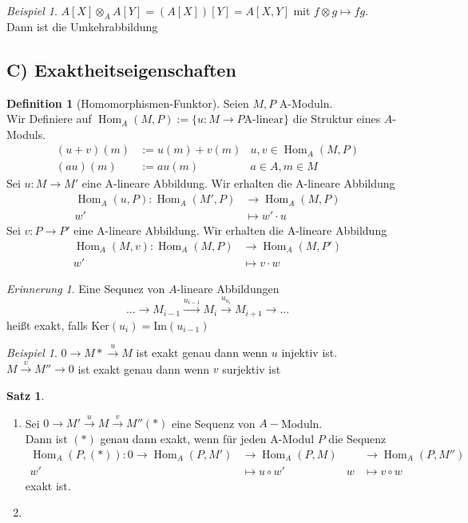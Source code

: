 \documentclass[10pt,a4paper]{article}
\newcommand{\Hom}{\operatorname{Hom}}
\newcounter{thm}[section]
\theoremstyle{definition}
\newtheorem{definition}[thm]{Definition}
\newtheorem{satz}[thm]{Satz}
\theoremstyle{plain}
\theoremstyle{remark}
\newtheorem{rem}[thm]{Erinnerung}
\newtheorem{exm}[thm]{Beispiel}
\begin{document}
\begin{exm}
	$A[X]\otimes_A A[Y]=(A[X])[Y]=A[X,Y]$ mit $f\otimes g\mapsto fg$.\\
	Dann ist die Umkehrabbildung
\end{exm}
\subsection*{C) Exaktheitseigenschaften}
\begin{definition}[Homomorphismen-Funktor]
	Seien $M,P$ A-Moduln.\\
	Wir Definiere auf $\Hom_A(M,P):=\{u:M\rightarrow P \text{A-linear}\}$ die Struktur eines $A$-Moduls.
	\begin{align*}
	(u+v)(m)&:=u(m)+v(m) &u,v\in\Hom_A(M,P)\\
	(au)(m)&:=au(m)		 &a\in A,m\in M
	\end{align*}
	Sei $u:M\rightarrow M'$ eine A-lineare Abbildung. Wir erhalten die A-lineare Abbildung
	\begin{align*}
	\Hom_A(u,P):\Hom_A(M',P)&\rightarrow \Hom_A(M,P)\\
	w'&\mapsto w'\cdot u
	\end{align*}
	Sei $v:P\rightarrow P'$ eine A-lineare Abbildung. Wir erhalten die A-lineare Abbildung
	\begin{align*}
	\Hom_A(M,v):\Hom_A(M,P)&\rightarrow \Hom_A(M,P')\\
	w'&\mapsto v\cdot w
	\end{align*}
\end{definition}
\begin{rem}
	Eine Sequnez von $A$-lineare Abbildungen\[...\rightarrow M_{i-1}\xrightarrow{u_{i-1}}M_i\xrightarrow{u_{u_i}}M_{i+1}\rightarrow ...\]
	heißt exakt, falls $\text{Ker}(u_i)=\text{Im}(u_{i-1})$
\end{rem}
\begin{exm}
	$0\rightarrow M*\xrightarrow{u}M$ ist exakt genau dann wenn $u$ injektiv ist.\\
	$M\xrightarrow{v}M''\rightarrow 0$ ist exakt genau dann wenn $v$ surjektiv ist
\end{exm}
\begin{satz}
	\begin{enumerate}
		\item Sei $0\rightarrow M'\xrightarrow{u}M\xrightarrow{v}M''(*)$ eine Sequenz von $A-$Moduln.\\
		Dann ist $(*)$ genau dann exakt, wenn für jeden A-Modul $P$ die Sequenz
		\begin{align*}
		\Hom_A(P,(*)):0\rightarrow \Hom_A(P,M')&\rightarrow \Hom_A(P,M)&&\rightarrow \Hom_A(P,M'')\\
		w'&\mapsto u\circ w'&w&\mapsto v\circ w
		\end{align*}
		exakt ist.
		\item %
	\end{enumerate}
\end{satz}
\end{document}

